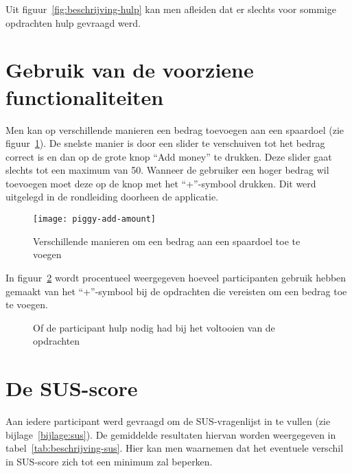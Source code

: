 Uit figuur~\ref{fig:beschrijving-hulp} kan men afleiden dat er slechts voor sommige opdrachten hulp gevraagd werd.

\section{Gebruik van de voorziene functionaliteiten}
\label{sec:gebruik-functionaliteiten}

Men kan op verschillende manieren een bedrag toevoegen aan een spaardoel (zie figuur~\ref{fig:piggy:add-amount}). De snelste manier is door een slider te verschuiven tot het bedrag correct is en dan op de grote knop ``Add money'' te drukken. Deze slider gaat slechts tot een maximum van 50. Wanneer de gebruiker een hoger bedrag wil toevoegen moet deze op de knop met het ``+''-symbool drukken. Dit werd uitgelegd in de rondleiding doorheen de applicatie.

\begin{figure}[h!]
    \centering
    \texttt{[image: piggy-add-amount]}
    \caption{Verschillende manieren om een bedrag aan een spaardoel toe te voegen}
    \label{fig:piggy:add-amount}
\end{figure}

In figuur~\ref{fig:beschrijving-plus} wordt procentueel weergegeven hoeveel participanten gebruik hebben gemaakt van het ``+''-symbool bij de opdrachten die vereisten om een bedrag toe te voegen.

\begin{figure}[h]
    \centering
    \qquad
    \caption{Of de participant hulp nodig had bij het voltooien van de opdrachten}
    \label{fig:beschrijving-plus}
\end{figure}

\section{De SUS-score}
\label{sec:sus}

Aan iedere participant werd gevraagd om de SUS-vragenlijst in te vullen (zie bijlage~\ref{bijlage:sus}). De gemiddelde resultaten hiervan worden weergegeven in tabel~\ref{tab:beschrijving-sus}. Hier kan men waarnemen dat het eventuele verschil in SUS-score zich tot een minimum zal beperken.

